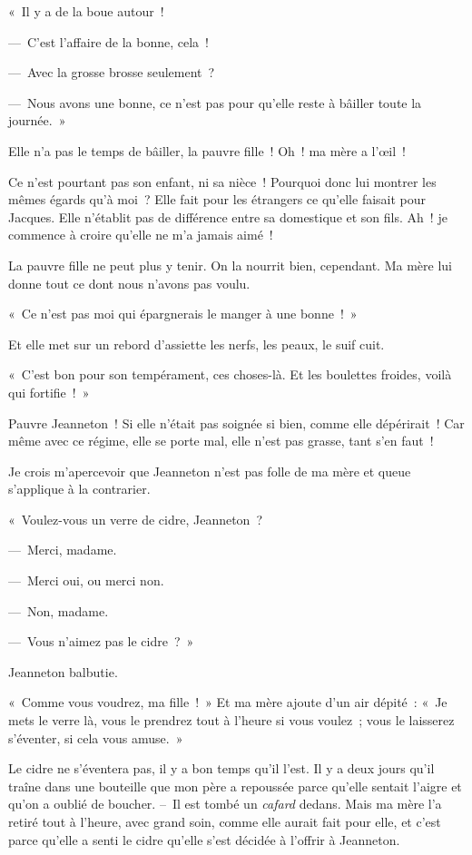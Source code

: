 \documentclass[french,twoside]{book} %
\begin{document}
« Il y a de la boue autour !\par
— C’est l’affaire de la bonne, cela !\par
— Avec la grosse brosse seulement ?\par
— Nous avons une bonne, ce n’est pas pour qu’elle reste à bâiller toute la journée. »\par
Elle n’a pas le temps de bâiller, la pauvre fille ! Oh ! ma mère a l’œil !\par
Ce n’est pourtant pas son enfant, ni sa nièce ! Pourquoi donc lui montrer les mêmes égards qu’à moi ? Elle fait pour les étrangers ce qu’elle faisait pour Jacques. Elle n’établit pas de différence entre sa domestique et son fils. Ah ! je commence à croire qu’elle ne m’a jamais aimé !\par
La pauvre fille ne peut plus y tenir. On la nourrit bien, cependant. Ma mère lui donne tout ce dont nous n’avons pas voulu.\par
« Ce n’est pas moi qui épargnerais le manger à une bonne ! »\par
Et elle met sur un rebord d’assiette les nerfs, les peaux, le suif cuit.\par
« C’est bon pour son tempérament, ces choses-là. Et les boulettes froides, voilà qui fortifie ! »\par
Pauvre Jeanneton ! Si elle n’était pas soignée si bien, comme elle dépérirait ! Car même avec ce régime, elle se porte mal, elle n’est pas grasse, tant s’en faut !\par
Je crois m’apercevoir que Jeanneton n’est pas folle de ma mère et queue s’applique à la contrarier.\par
« Voulez-vous un verre de cidre, Jeanneton ?\par
— Merci, madame.\par
— Merci oui, ou merci non.\par
— Non, madame.\par
— Vous n’aimez pas le cidre ? »\par
Jeanneton balbutie.\par
« Comme vous voudrez, ma fille ! » Et ma mère ajoute d’un air dépité : « Je mets le verre là, vous le prendrez tout à l’heure si vous voulez ; vous le laisserez s’éventer, si cela vous amuse. »\par
Le cidre ne s’éventera pas, il y a bon temps qu’il l’est. Il y a deux jours qu’il traîne dans une bouteille que mon père a repoussée parce qu’elle sentait l’aigre et qu’on a oublié de boucher. – Il est tombé un \emph{cafard} dedans. Mais ma mère l’a retiré tout à l’heure, avec grand soin, comme elle aurait fait pour elle, et c’est parce qu’elle a senti le cidre qu’elle s’est décidée à l’offrir à Jeanneton.\par
\end{document}
